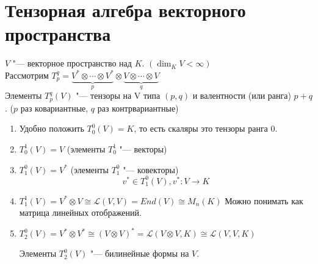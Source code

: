 ﻿
\section{Тензорная алгебра векторного пространства}
\begin{Def}
$V$ "--- векторное пространство над $K$. $(\dim_{K}V < \infty)$\\
Рассмотрим $T_p^q = \underbrace{V^*\otimes \cdots \otimes V^*}_{p} \otimes \underbrace{V \otimes \cdots \otimes V}_{q}$\\
Элементы $T_{p}^q(V)$ "--- тензоры на V типа $(p, q)$ и валентности (или ранга) $p + q$. ($p$ раз ковариантные, $q$ раз контрвариантные)
\end{Def}
\begin{exmp} \hfill
\begin{enumerate}
\item Удобно положить $T_0^0(V)= K$, то есть скаляры это тензоры ранга 0.
\item $T_0^1(V) = V$ (элементы $T_0^1$ "--- векторы)
\item $T_1^0(V) = V^*$ (элементы $T_1^0$ "--- ковекторы)\\
$$v^* \in T_1^0(V), v^* \colon V \to K$$
\item 
$T_1^1(V) = V^* \otimes V \cong \mathcal{L}(V, V) = End(V) \cong M_n(K)$
Можно понимать как матрица линейных отображений. 
\item
$T_2^0(V) = V^*\otimes V^* \cong (V \otimes V)^* = \mathcal{L}(V \otimes V, K) \cong \mathcal{L}(V, V, K)$ 

Элементы $T_2^0(V)$ "--- билинейные формы на $V$.
\end{enumerate}
\end{exmp}

